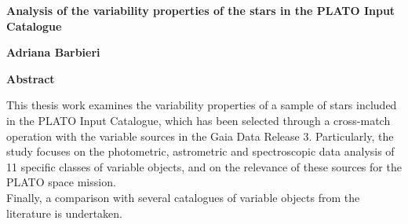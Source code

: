 

\fancyhf{} %
\fancyhead[RO,R]{\thepage} %
\renewcommand{\headrulewidth}{0pt}

\begin{center}
    \Large
    \textbf{Analysis of the variability properties of the stars in the PLATO Input Catalogue}
    
    \vspace{0.4cm}
    \textbf{Adriana Barbieri}
    
    \vspace{0.9cm}
    \textbf{Abstract}
\end{center}
This thesis work examines the variability properties of a sample of stars included in the PLATO Input Catalogue, which has been selected through a cross-match operation with the variable sources in the Gaia Data Release 3.
Particularly, the study focuses on the photometric, astrometric and spectroscopic data analysis of 11 specific classes of variable objects, and on the relevance of these sources for the PLATO space mission.\\
Finally, a comparison with several catalogues of variable objects from the literature is undertaken. 